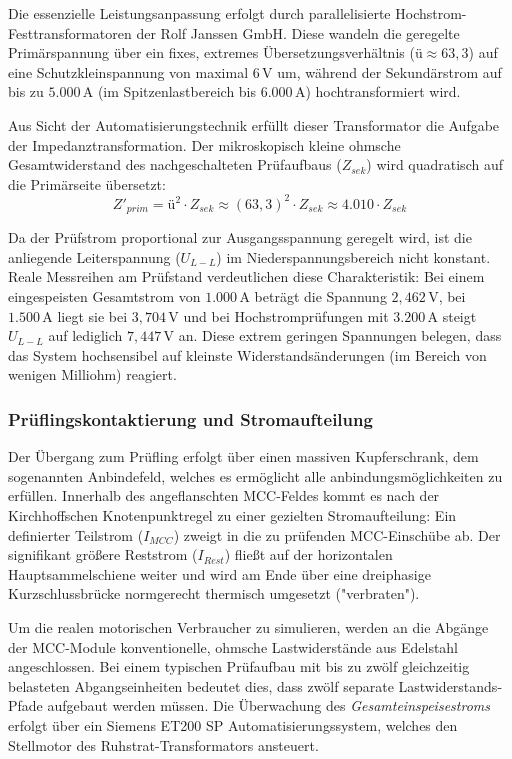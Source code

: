 Die essenzielle Leistungsanpassung erfolgt durch parallelisierte Hochstrom-Festtransformatoren der Rolf Janssen GmbH. Diese wandeln die geregelte Primärspannung über ein fixes, extremes Übersetzungsverhältnis ($ü \approx 63,3$) auf eine Schutzkleinspannung von maximal $6\,\text{V}$ um, während der Sekundärstrom auf bis zu $5.000\,\text{A}$ (im Spitzenlastbereich bis $6.000\,\text{A}$) hochtransformiert wird. 

Aus Sicht der Automatisierungstechnik erfüllt dieser Transformator die Aufgabe der Impedanztransformation. Der mikroskopisch kleine ohmsche Gesamtwiderstand des nachgeschalteten Prüfaufbaus ($Z_{sek}$) wird quadratisch auf die Primärseite übersetzt:
\begin{equation}
    Z'_{prim} = ü^2 \cdot Z_{sek} \approx (63,3)^2 \cdot Z_{sek} \approx 4.010 \cdot Z_{sek}
\end{equation}

Da der Prüfstrom proportional zur Ausgangsspannung geregelt wird, ist die anliegende Leiterspannung ($U_{L-L}$) im Niederspannungsbereich nicht konstant. Reale Messreihen am Prüfstand verdeutlichen diese Charakteristik: Bei einem eingespeisten Gesamtstrom von $1.000\,\text{A}$ beträgt die Spannung $2,462\,\text{V}$, bei $1.500\,\text{A}$ liegt sie bei $3,704\,\text{V}$ und bei Hochstromprüfungen mit $3.200\,\text{A}$ steigt $U_{L-L}$ auf lediglich $7,447\,\text{V}$ an. Diese extrem geringen Spannungen belegen, dass das System hochsensibel auf kleinste Widerstandsänderungen (im Bereich von wenigen Milliohm) reagiert.
\subsubsection{Prüflingskontaktierung und Stromaufteilung}
Der Übergang zum Prüfling erfolgt über einen massiven Kupferschrank, dem sogenannten Anbindefeld, welches es ermöglicht alle anbindungsmöglichkeiten zu erfüllen. Innerhalb des angeflanschten MCC-Feldes kommt es nach der Kirchhoffschen Knotenpunktregel zu einer gezielten Stromaufteilung: Ein definierter Teilstrom ($I_{MCC}$) zweigt in die zu prüfenden MCC-Einschübe ab. Der signifikant größere Reststrom ($I_{Rest}$) fließt auf der horizontalen Hauptsammelschiene weiter und wird am Ende über eine dreiphasige Kurzschlussbrücke normgerecht thermisch umgesetzt ("verbraten").

Um die realen motorischen Verbraucher zu simulieren, werden an die Abgänge der MCC-Module konventionelle, ohmsche Lastwiderstände aus Edelstahl angeschlossen. Bei einem typischen Prüf\-aufbau mit bis zu zwölf gleichzeitig belasteten Abgangseinheiten bedeutet dies, dass zwölf separate Lastwiderstands-Pfade aufgebaut werden müssen. Die Überwachung des \textit{Gesamteinspeisestroms} erfolgt über ein Siemens ET200 SP Automatisierungssystem, welches den Stellmotor des Ruhstrat-Transformators ansteuert.


